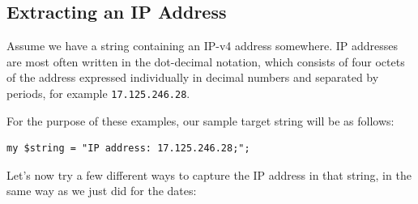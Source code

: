 \subsection{Extracting an IP Address}

Assume we have a string containing an IP-v4 address 
somewhere. IP addresses are most often written in the 
dot-decimal notation, which consists of four octets of 
the address expressed individually in decimal numbers and 
separated by periods, for example {\tt 17.125.246.28}.

For the purpose of these examples, our sample target string 
will be as follows:

\begin{verbatim}
my $string = "IP address: 17.125.246.28;";
\end{verbatim}
%

Let's now try a few different ways to capture the IP address 
in that string, in the same way as we just did for the dates:

